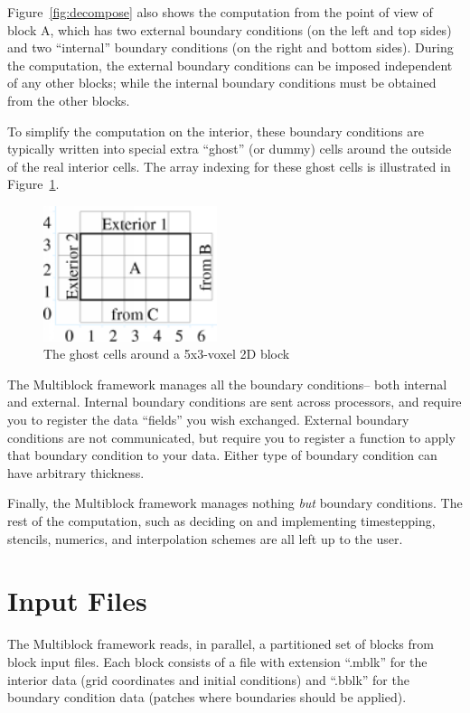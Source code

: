 \documentclass[10pt]{article}
\begin{document}
Figure~\ref{fig:decompose} also shows the computation 
from the point of view of block A, which has two external
boundary conditions (on the left and top sides) and two 
``internal'' boundary conditions (on the right and bottom sides).
During the computation, the external boundary conditions can
be imposed independent of any other blocks; while the internal 
boundary conditions must be obtained from the other blocks.

To simplify the computation on the interior, these boundary conditions
are typically written into special extra ``ghost'' (or dummy) cells
around the outside of the real interior cells.  The array indexing
for these ghost cells is illustrated in Figure~\ref{fig:indexing}.

\begin{figure}[h]
\begin{center}
\includegraphics[width=2in]{fig/indexing}
\end{center}
\caption{The ghost cells around a 5x3-voxel 2D block}
\label{fig:indexing}
\end{figure}


The Multiblock framework manages all the boundary conditions--
both internal and external.  Internal boundary conditions are 
sent across processors, and require you to register the data 
``fields'' you wish exchanged.  External boundary conditions are
not communicated, but require you to register a function to
apply that boundary condition to your data.  Either type of boundary 
condition can have arbitrary thickness.

Finally, the Multiblock framework manages nothing {\em but} boundary conditions.
The rest of the computation, such as deciding on and implementing
timestepping, stencils, numerics, and interpolation schemes are all 
left up to the user.  

\section{Input Files}
The Multiblock framework reads, in parallel, a partitioned set of 
blocks from block input files.  Each block consists of a file
with extension ``.mblk'' for the interior data (grid coordinates
and initial conditions) and ``.bblk'' for the boundary condition data
(patches where boundaries should be applied).
\end{document}
